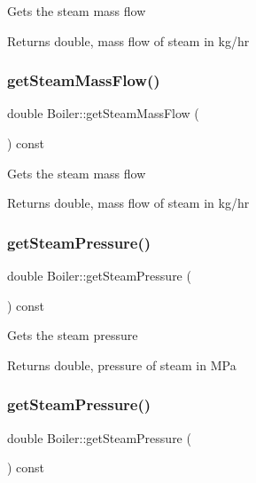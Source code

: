 Gets the steam mass flow \begin{DoxyReturn}{Returns}
double, mass flow of steam in kg/hr 
\end{DoxyReturn}
\mbox{\label{class_boiler_a4101e71234995558a451dcab145b5fc9}} 
\subsubsection{\texorpdfstring{get\+Steam\+Mass\+Flow()}{getSteamMassFlow()}\hspace{0.1cm}{\footnotesize\ttfamily [3/3]}}
{\footnotesize\ttfamily double Boiler\+::get\+Steam\+Mass\+Flow (\begin{DoxyParamCaption}{ }\end{DoxyParamCaption}) const}

Gets the steam mass flow \begin{DoxyReturn}{Returns}
double, mass flow of steam in kg/hr 
\end{DoxyReturn}
\mbox{\label{class_boiler_a99d4bbace6ef20bcbdc4b0cfcdc43213}} 
\subsubsection{\texorpdfstring{get\+Steam\+Pressure()}{getSteamPressure()}\hspace{0.1cm}{\footnotesize\ttfamily [1/3]}}
{\footnotesize\ttfamily double Boiler\+::get\+Steam\+Pressure (\begin{DoxyParamCaption}{ }\end{DoxyParamCaption}) const}

Gets the steam pressure \begin{DoxyReturn}{Returns}
double, pressure of steam in M\+Pa 
\end{DoxyReturn}
\mbox{\label{class_boiler_a99d4bbace6ef20bcbdc4b0cfcdc43213}} 
\subsubsection{\texorpdfstring{get\+Steam\+Pressure()}{getSteamPressure()}\hspace{0.1cm}{\footnotesize\ttfamily [2/3]}}
{\footnotesize\ttfamily double Boiler\+::get\+Steam\+Pressure (\begin{DoxyParamCaption}{ }\end{DoxyParamCaption}) const}

